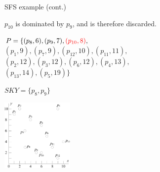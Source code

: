 \documentclass{beamer}
\def\vgap{\vspace{5mm}}
\newcommand{\red}[1]{\textcolor{red}{#1}}
\begin{document}
    \begin{frame}{SFS example (cont.)}
    \begin{small} \label{fra:sfs-sort}
		$p_{10}$ is dominated by $p_9$, and is therefore discarded.

		\vgap

        \begin{minipage}[b]{0.5\linewidth}
            $P = \{(p_8, 6), (p_9, 7), \red{(p_{10}, 8)},$ \\
            $(p_1, 9), (p_7, 9), (p_{12}, 10), (p_{11}, 11),$ \\
            $(p_2, 12), (p_3, 12), (p_6, 12), (p_4, 13),$ \\
            $(p_{13}, 14), (p_5, 19)\}$ \vspace{10mm}

			$SKY = \{p_8, p_9\}$
        \end{minipage}
        \begin{minipage}[b]{0.45\linewidth}
            \begin{center}
                \includegraphics[height=35mm]{./artwork/data.pdf}
            \end{center}
        \end{minipage}
    \end{small}
    \end{frame}
\end{document}
